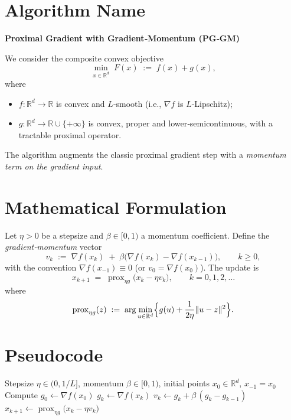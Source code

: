\documentclass{article}
\newcommand{\prox}{\operatorname{prox}}
\begin{document}
\section*{Algorithm Name}
\textbf{Proximal Gradient with Gradient‑Momentum (PG‑GM)}  

We consider the composite convex objective  
\[
\min_{x\in\mathbb{R}^d} \; F(x)\;:=\;f(x)+g(x),
\]
where  

\begin{itemize}
\item $f:\mathbb{R}^d\to\mathbb{R}$ is convex and $L$‑smooth (i.e., $\nabla f$ is $L$‑Lipschitz);
\item $g:\mathbb{R}^d\to\mathbb{R}\cup\{+\infty\}$ is convex, proper and lower‑semicontinuous, with a tractable proximal operator.
\end{itemize}

The algorithm augments the classic proximal gradient step with a \emph{momentum term on the gradient input}.  

\section*{Mathematical Formulation}
Let $\eta>0$ be a stepsize and $\beta\in[0,1)$ a momentum coefficient.  
Define the \emph{gradient‑momentum} vector
\[
v_k \;:=\; \nabla f(x_k) \;+\; \beta\bigl(\nabla f(x_k)-\nabla f(x_{k-1})\bigr),\qquad k\ge 0,
\tag{1}
\]
with the convention $\nabla f(x_{-1})\equiv 0$ (or $v_0=\nabla f(x_0)$).  
The update is
\[
x_{k+1}\;=\;\prox_{\eta g}\!\bigl(x_k-\eta v_k\bigr),\qquad k=0,1,2,\dots
\tag{2}
\]
where
\[
\prox_{\eta g}(z)\;:=\;\arg\min_{u\in\mathbb{R}^d}\Bigl\{ g(u)+\frac{1}{2\eta}\|u-z\|^2\Bigr\}.
\]

\section*{Pseudocode}
\begin{algorithm}[H]
\caption{Proximal Gradient with Gradient‑Momentum (PG‑GM)}
\begin{algorithmic}[1]
\Require Stepsize $\eta\in(0,1/L]$, momentum $\beta\in[0,1)$, initial points $x_{0}\in\mathbb{R}^{d}$, $x_{-1}=x_{0}$
\State Compute $g_{0}\gets \nabla f(x_{0})$
    \State $g_{k}\gets \nabla f(x_{k})$ 
    \State $v_{k}\gets g_{k}+ \beta\,(g_{k}-g_{k-1})$ 
    \State $x_{k+1}\gets \prox_{\eta g}\!\bigl(x_{k}-\eta v_{k}\bigr)$ 
\EndFor
\end{algorithmic}
\end{algorithm}
\end{document}
